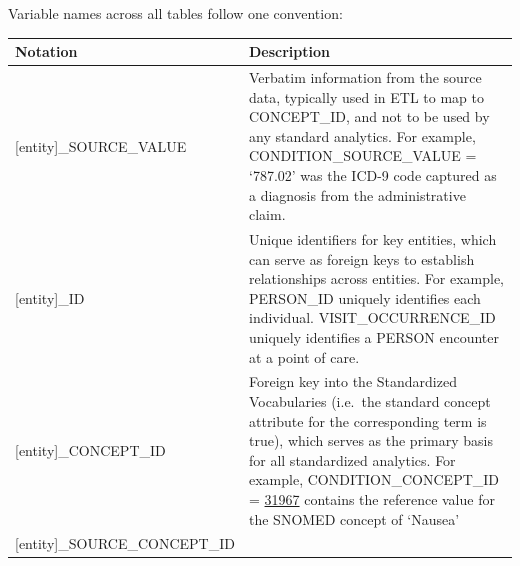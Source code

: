 \documentclass[11pt]{book}
\begin{document}
Variable names across all tables follow one convention:

\begin{longtable}[]{@{}ll@{}}
\toprule
\begin{minipage}[b]{0.34\columnwidth}\raggedright\strut
Notation\strut
\end{minipage} & \begin{minipage}[b]{0.61\columnwidth}\raggedright\strut
Description\strut
\end{minipage}\tabularnewline
\midrule
\endhead
\begin{minipage}[t]{0.34\columnwidth}\raggedright\strut
{[}entity{]}\_SOURCE\_VALUE\strut
\end{minipage} & \begin{minipage}[t]{0.61\columnwidth}\raggedright\strut
Verbatim information from the source data, typically used in ETL to map
to CONCEPT\_ID, and not to be used by any standard analytics. For
example, CONDITION\_SOURCE\_VALUE = `787.02' was the ICD-9 code captured
as a diagnosis from the administrative claim.\strut
\end{minipage}\tabularnewline
\begin{minipage}[t]{0.34\columnwidth}\raggedright\strut
{[}entity{]}\_ID\strut
\end{minipage} & \begin{minipage}[t]{0.61\columnwidth}\raggedright\strut
Unique identifiers for key entities, which can serve as foreign keys to
establish relationships across entities. For example, PERSON\_ID
uniquely identifies each individual. VISIT\_OCCURRENCE\_ID uniquely
identifies a PERSON encounter at a point of care.\strut
\end{minipage}\tabularnewline
\begin{minipage}[t]{0.34\columnwidth}\raggedright\strut
{[}entity{]}\_CONCEPT\_ID\strut
\end{minipage} & \begin{minipage}[t]{0.61\columnwidth}\raggedright\strut
Foreign key into the Standardized Vocabularies (i.e.~the standard
concept attribute for the corresponding term is true), which serves as
the primary basis for all standardized analytics. For example,
CONDITION\_CONCEPT\_ID =
\href{http://athena.ohdsi.org/search-terms/terms/31967}{31967} contains
the reference value for the SNOMED concept of `Nausea'\strut
\end{minipage}\tabularnewline
\begin{minipage}[t]{0.34\columnwidth}\raggedright\strut
{[}entity{]}\_SOURCE\_CONCEPT\_ID\strut

\end{minipage}
\end{longtable}
\end{document}
